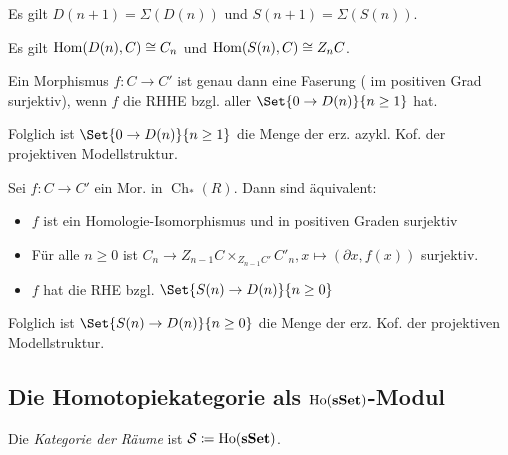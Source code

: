 \documentclass{cheat-sheet}
\DeclareMathOperator{\Ho}{Ho} %
\DeclareMathOperator{\Ch}{Ch} %
\begin{document}
\begin{bem}
  Es gilt $D(n+1) = \Sigma(D(n))$ und $S(n+1) = \Sigma(S(n))$.
\end{bem}

\begin{bem}
  Es gilt $\operatorname{Hom}(D(n), C) \cong C_n$ und $\operatorname{Hom}(S(n), C) \cong Z_n C$.
\end{bem}

\begin{lem}
  Ein Morphismus $f : C \to C'$ ist genau dann eine Faserung (\dh{} im positiven Grad surjektiv), wenn $f$ die RHHE bzgl. aller $\Set{0 \to D(n)}{n \geq 1}$ hat.
\end{lem}

\begin{bem}
  Folglich ist $\Set{0 \to D(n)}{n \geq 1}$ die Menge der erz. azykl. Kof. der projektiven Modellstruktur.
\end{bem}

\begin{lem}
  Sei $f : C \to C'$ ein Mor. in $\Ch_*(R)$.
  Dann sind äquivalent:
  \begin{itemize}
    \item $f$ ist ein Homologie-Isomorphismus und in positiven Graden surjektiv
    \item Für alle $n \geq 0$ ist $C_n \to Z_{n-1} C \times_{Z_{n-1} C'} C'_n, x \mapsto (\partial x, f(x))$ surjektiv.
    \item $f$ hat die RHE bzgl. $\Set{S(n) \to D(n)}{n \geq 0}$
  \end{itemize}
\end{lem}

\begin{bem}
  Folglich ist $\Set{S(n) \to D(n)}{n \geq 0}$ die Menge der erz. Kof. der projektiven Modellstruktur.
\end{bem}


\subsection{Die Homotopiekategorie als $\Ho(\sSet)$-Modul}

\begin{defn}
  Die \emph{Kategorie der Räume} ist $\Sat \coloneqq \Ho(\sSet)$.
\end{defn}
\end{document}

